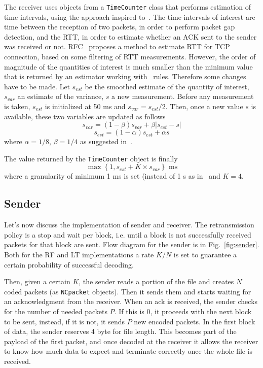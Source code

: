 The receiver uses objects from a \texttt{TimeCounter} class that performs estimation of time intervals, using the approach inspired to~\cite{rfc6298}. The time intervals of interest are time between the reception of two packets, in order to perform packet gap detection, and the RTT, in order to estimate whether an ACK sent to the sender was received or not. RFC~\cite{rfc6298} proposes a method to estimate RTT for TCP connection, based on some filtering of RTT measurements. However, the order of magnitude of the quantities of interest is much smaller than the minimum value that is returned by an estimator working with~\cite{rfc6298} rules. Therefore some changes have to be made. Let $s_{est}$ be the smoothed estimate of the quantity of interest, $s_{var}$ an estimate of the variance, $s$ a new measurement. Before any measurement is taken, $s_{est}$ is initialized at 50 ms and $s_{var} = s_{est}/2$. Then, once a new value $s$ is available, these two variables are updated as follows
\begin{equation}
	s_{var} = (1-\beta) s_{var}  + \beta |s_{est} - s|
\end{equation}
\begin{equation}
	s_{est} = (1 - \alpha) s_{est} + \alpha s
\end{equation}
where $\alpha = 1/8$, $\beta = 1/4$ as suggested in~\cite{rfc6298}.

The value returned by the \texttt{TimeCounter} object is finally
\begin{equation}
	\max\left\{1, s_{est} + K\times s_{var}  \right\} \mbox{ ms}
\end{equation}
where a granularity of minimum 1 ms is set (instead of 1 s as in~\cite{rfc6298} and $K = 4$. 

\subsection{Sender}
Let's now discuss the implementation of sender and receiver. The retransmission policy is a stop and wait per block, i.e. until a block is not successfully received packets for that block are sent. Flow diagram for the sender is in Fig.~\ref{fig:sender}. Both for the RF and LT implementations a rate $K/N$ is set to guarantee a certain probability of successful decoding. 

Then, given a certain $K$, the sender reads a portion of the file and creates $N$ coded packets (as \texttt{NCpacket} objects). Then it sends them and starts waiting for an acknowledgment from the receiver. When an ack is received, the sender checks for the number of needed packets $P$. If this is 0, it proceeds with the next block to be sent, instead, if it is not, it sends $P$ new encoded packets. In the first block of data, the sender reserves 4 byte for file length. This becomes part of the payload of the first packet, and once decoded at the receiver it allows the receiver to know how much data to expect and terminate correctly once the whole file is received. 

